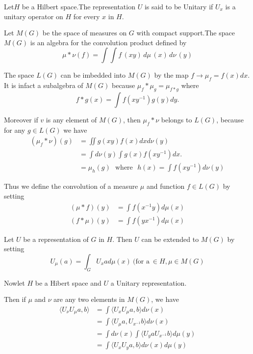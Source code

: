 \begin{defi*}
  Let\pageoriginale $H$ be a Hilbert space.The representation $U$ is said to be
  Unitary if $U_x$ is a unitary operator on $H$ for every $x$ in $H$. 
\end{defi*}

Let $M(G)$ be the space of measures on $G$ with compact support.The
space $M(G)$ is an algebra for the convolution product defined by  
$$ 
\mu * \nu (f)=\int \int f\,(x y )\,d \mu \,(x)\, d \nu\,(y)
$$

The space $L(G)$ can be imbedded into $M(G)$ by the map $ f \to \mu_f
= f(x)dx$. It is infact a subalgebra of $M(G)$ because $\mu_f * \mu _g
= \mu_{f *g}$ where 
$$
f* g(x)= \int f(xy^{-1}) g(y) dy.
$$

Moreover if $v$ is any element of $M(G)$, then $\mu_f * \nu $
belongs to $L(G)$, because for any $g \in L(G)$ we have 
\begin{align*}
  (\mu _f * \nu)(g) & = \iint  g(xy) f(x) dx d \nu (y)\\
  & = \int d \nu (y) \int g(x) f(xy^{-1}) dx.\\
  & = \mu_h(g) \text{~ where~ } h(x)=\int f(xy^{-1}) d \nu (y)
\end{align*}

Thus we define the convolution of a measure $\mu$ and function $f \in
L(G)$ by setting 
\begin{align*}
  (\mu  *f )(y) & = \int f(x^{-1}y) d \mu (x)\\
  (f * \mu )(y) & = \int f(y x^{-1}) d \mu (x)
\end{align*}

Let $U$ be a representation of $G$ in $H$. Then $U$ can be extended to
$M(G)$ by setting 
$$
U_\mu (a)= \int_G U_x a d \mu (x)~(\text{for a}~ \in H, \mu \in M(G)
$$

Now\pageoriginale let $H$ be a Hibert space and $U$ a Unitary representation. 

Then if $\mu$ and $\nu$ are any two elements in $M(G)$, we have
\begin{align*}
  \langle U_\nu U_\mu a,b \rangle & = \int \langle U_x U_\mu a,b
  \rangle d \nu (x)\\ 
  & = \int \langle U_\mu a, U_{x^{-1}} b \rangle d \nu (x)\\
  & = \int d \nu (x) \int \langle U_y a U_{x^{-1}} b \rangle d \mu(y)\\
  & = \int \langle U_x U_y a,b \rangle  d \nu (x) d \mu(y)
\end{align*}

